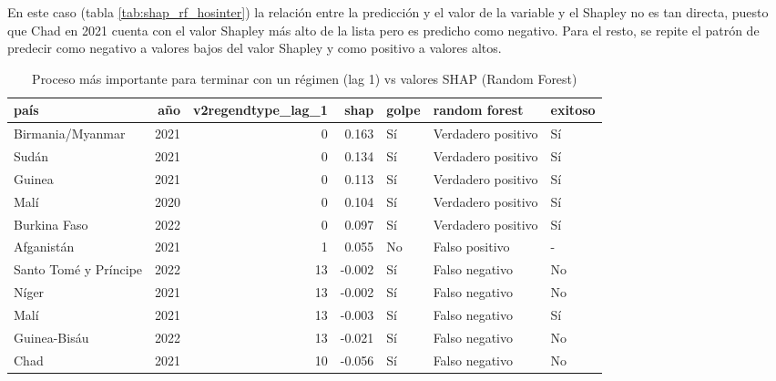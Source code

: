\documentclass{article}
\begin{document}
En este caso (tabla \ref{tab:shap_rf_hosinter}) la relación entre la predicción y el valor de la 
variable y el Shapley no es tan directa, puesto que Chad en 2021 cuenta con el valor Shapley más 
alto de la lista pero es predicho como negativo. Para el resto, se repite el patrón de predecir 
como negativo a valores bajos del valor Shapley y como positivo a valores altos.

\begin{table}[H]
  \centering
  \begin{tabular}{lrrrlll}
    \toprule
    país & año & v2regendtype\_lag\_1 & shap & golpe & random forest & exitoso \\
    \midrule
    Birmania/Myanmar & 2021 & 0 & 0.163 & Sí & Verdadero positivo & Sí \\
    Sudán & 2021 & 0 & 0.134 & Sí & Verdadero positivo & Sí \\
    Guinea & 2021 & 0 & 0.113 & Sí & Verdadero positivo & Sí \\
    Malí & 2020 & 0 & 0.104 & Sí & Verdadero positivo & Sí \\
    Burkina Faso & 2022 & 0 & 0.097 & Sí & Verdadero positivo & Sí \\
    Afganistán & 2021 & 1 & 0.055 & No & Falso positivo & - \\
    Santo Tomé y Príncipe & 2022 & 13 & -0.002 & Sí & Falso negativo & No \\
    Níger & 2021 & 13 & -0.002 & Sí & Falso negativo & No \\
    Malí & 2021 & 13 & -0.003 & Sí & Falso negativo & Sí \\
    Guinea-Bisáu & 2022 & 13 & -0.021 & Sí & Falso negativo & No \\
    Chad & 2021 & 10 & -0.056 & Sí & Falso negativo & No \\
    \bottomrule
    \end{tabular}
\caption{Proceso más importante para terminar con un régimen (lag 1) vs valores 
          SHAP (Random Forest) \label{tab:shap_rf_regend}}
\end{table}
\end{document}
